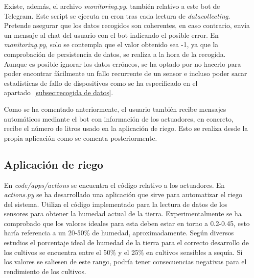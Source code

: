 \documentclass[a4paper, 12pt, oneside]{book}
\begin{document}
Existe, además, el archivo \textit{monitoring.py}, también relativo a este bot de Telegram. Este script se ejecuta en cron tras cada lectura de \textit{datacollecting}. Pretende asegurar que los datos recogidos son coherentes, en caso contrario, envía un mensaje al chat del usuario con el bot indicando el posible error. En \textit{monitoring.py}, solo se contempla que el valor obtenido sea -1, ya que la comprobación de persistencia de datos, se realiza a la hora de la recogida. Aunque es posible ignorar los datos erróneos, se ha optado por no hacerlo para poder encontrar fácilmente un fallo recurrente de un sensor e incluso poder sacar estadísticas de fallo de dispositivos como se ha especificado en el apartado~\ref{subsec:recogida de datos}.

Como se ha comentado anteriormente, el usuario también recibe mensajes automáticos mediante el bot con información de los actuadores, en concreto, recibe el número de litros usado en la aplicación de riego. Esto se realiza desde la propia aplicación como se comenta posteriormente.




\subsection{Aplicación de riego}
\label{subsec:riego}
En \textit{code/apps/actions} se encuentra el código relativo a los actuadores. En \textit{actions.py} se ha desarrollado una aplicación que sirve para automatizar el riego del sistema. Utiliza el código implementado para la lectura de datos de los sensores para obtener la humedad actual de la tierra. Experimentalmente se ha comprobado que los valores ideales para esta deben estar en torno a 0.2-0.45, esto haría referencia a un 20-50\% de humedad, aproximadamente. Según diversos estudios\cite{porcentaje_riego} \cite{humedad_suelo} el porcentaje ideal de humedad de la tierra para el correcto desarrollo de los cultivos se encuentra entre el 50\% y el 25\% en cultivos sensibles a sequía. Si los valores se saliesen de este rango, podría tener consecuencias negativas para el rendimiento de los cultivos. 
\end{document}
